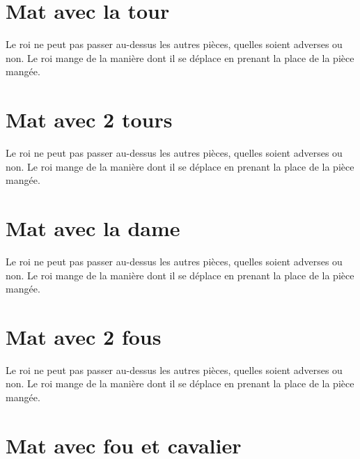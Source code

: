 \documentclass[a5paper,openany,twocolumn]{book}
\begin{document}
{\setcounter{chapter}{0}

\chapter{Mat avec la tour}
 
Le roi ne peut pas passer au-dessus les autres pièces, quelles soient adverses ou non. Le roi mange de la manière dont il se déplace en prenant la place de la pièce mangée. 


\chapter{Mat avec 2 tours}
  
Le roi ne peut pas passer au-dessus les autres pièces, quelles soient adverses ou non. Le roi mange de la manière dont il se déplace en prenant la place de la pièce mangée. 

	
\chapter{Mat avec la dame}

Le roi ne peut pas passer au-dessus les autres pièces, quelles soient adverses ou non. Le roi mange de la manière dont il se déplace en prenant la place de la pièce mangée. 


\chapter{Mat avec 2 fous}
 
Le roi ne peut pas passer au-dessus les autres pièces, quelles soient adverses ou non. Le roi mange de la manière dont il se déplace en prenant la place de la pièce mangée. 


\chapter{Mat avec fou et cavalier}

}
\end{document}
